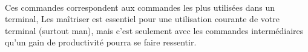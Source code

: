 \documentclass[french, a4paper, 12pt, titlepage]{article}
\begin{document}






\paragraph{} Ces commandes correspondent aux commandes les plus utilisées dans
un terminal,
Les maîtriser est essentiel pour une utilisation courante de votre terminal
(surtout man), mais c'est seulement avec les commandes intermédiaires qu'un
gain de productivité pourra se faire ressentir.

\newpage
\end{document}
